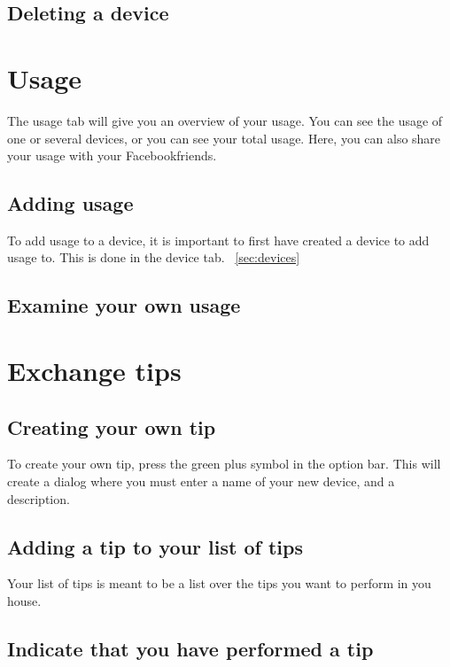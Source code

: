 \subsection{Deleting a device}


\section{Usage}
The usage tab will give you an overview of your usage. You can see the usage of one or several devices, or you can see your total usage. Here, you can also share your usage with your Facebookfriends.
\subsection{Adding usage}
To add usage to a device, it is important to first have created a device to add usage to. This is done in the device tab. ~\ref{sec:devices}
\subsection{Examine your own usage}


\section{Exchange tips}

\subsection{Creating your own tip}
To create your own tip, press the green plus symbol in the option bar. This will create a dialog where you must enter a name of your new device, and a description. 
\subsection{Adding a tip to your list of tips}
Your list of tips is meant to be a list over the tips you want to perform in you house. 
\subsection{Indicate that you have performed a tip}

